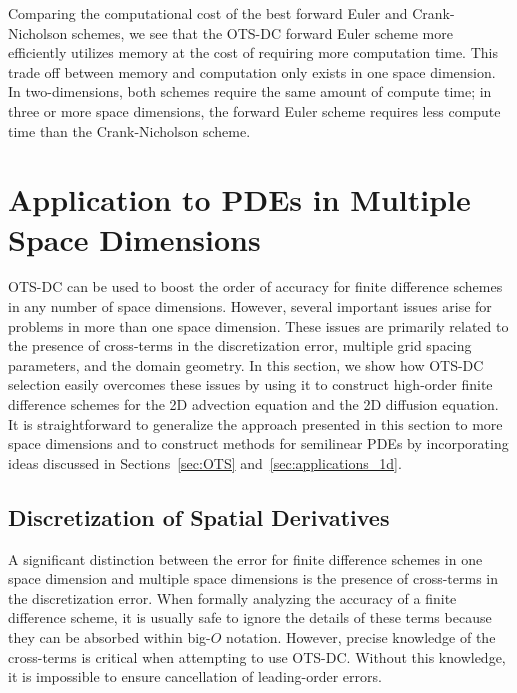 \documentclass[fleqn,12pt,twoside]{article}
\begin{document}
Comparing the computational cost of the best forward Euler and Crank-Nicholson 
schemes, we see that the OTS-DC forward Euler scheme more efficiently 
utilizes memory at the cost of requiring more computation time.  This trade off 
between memory and computation only exists in one space dimension.  In 
two-dimensions, both schemes require the same amount of compute time; in three 
or more space dimensions, the forward Euler scheme requires less compute time 
than the Crank-Nicholson scheme.  


\section{\label{sec:applications_multidim}
         Application to PDEs in Multiple Space Dimensions}
OTS-DC can be used to boost the order of accuracy for finite difference 
schemes in any number of space dimensions.  However, several important issues 
arise for problems in more than one space dimension.  These issues are 
primarily related to the presence of cross-terms in the discretization error, 
multiple grid spacing parameters,  and the domain geometry.  In this section, 
we show how OTS-DC selection easily overcomes these issues by using it to 
construct high-order finite difference schemes for the 2D advection equation 
and the 2D diffusion equation.  
It is straightforward to generalize the approach presented in this section to 
more space dimensions and to construct methods for semilinear PDEs by 
incorporating ideas discussed in 
Sections~\ref{sec:OTS} and~\ref{sec:applications_1d}.  


\subsection{\label{sec:ots_multidim_crossterms}
            Discretization of Spatial Derivatives}
A significant distinction between the error for finite difference schemes in 
one space dimension and multiple space dimensions is the presence of 
cross-terms in the discretization error.  When formally analyzing the accuracy
of a finite difference scheme, it is usually safe to ignore the details of 
these terms because they can be absorbed within big-$O$ notation.
However, precise knowledge of the cross-terms is critical when attempting to 
use OTS-DC.  Without this knowledge, it is impossible to 
ensure cancellation of leading-order errors.  
\end{document}
